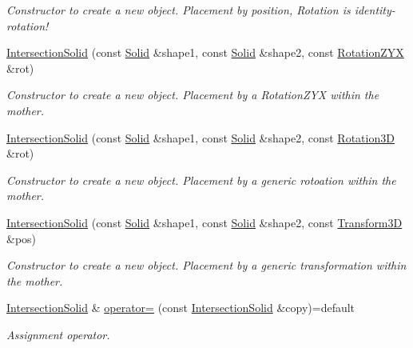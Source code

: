\begin{DoxyCompactItemize}
\begin{DoxyCompactList}\small\item\em Constructor to create a new object. Placement by position, Rotation is identity-\/rotation! \end{DoxyCompactList}\item 
\hyperlink{class_d_d4hep_1_1_geometry_1_1_intersection_solid_a350b9cf8a8d458930e25341c1be6f6af}{Intersection\+Solid} (const \hyperlink{namespace_d_d4hep_1_1_geometry_a83de90a8dcc7378ba47d54ef9a6a687b}{Solid} \&shape1, const \hyperlink{namespace_d_d4hep_1_1_geometry_a83de90a8dcc7378ba47d54ef9a6a687b}{Solid} \&shape2, const \hyperlink{namespace_d_d4hep_1_1_geometry_a24667b2b9c3cec3d5239828db4d52189}{Rotation\+Z\+YX} \&rot)
\begin{DoxyCompactList}\small\item\em Constructor to create a new object. Placement by a Rotation\+Z\+YX within the mother. \end{DoxyCompactList}\item 
\hyperlink{class_d_d4hep_1_1_geometry_1_1_intersection_solid_ae8220a5808a24ab8bacec490276ace38}{Intersection\+Solid} (const \hyperlink{namespace_d_d4hep_1_1_geometry_a83de90a8dcc7378ba47d54ef9a6a687b}{Solid} \&shape1, const \hyperlink{namespace_d_d4hep_1_1_geometry_a83de90a8dcc7378ba47d54ef9a6a687b}{Solid} \&shape2, const \hyperlink{namespace_d_d4hep_1_1_geometry_a022fecb763315fa2bf39cbb648944a0e}{Rotation3D} \&rot)
\begin{DoxyCompactList}\small\item\em Constructor to create a new object. Placement by a generic rotoation within the mother. \end{DoxyCompactList}\item 
\hyperlink{class_d_d4hep_1_1_geometry_1_1_intersection_solid_a07ed67ab3e7435dc62ecf109475a0d8d}{Intersection\+Solid} (const \hyperlink{namespace_d_d4hep_1_1_geometry_a83de90a8dcc7378ba47d54ef9a6a687b}{Solid} \&shape1, const \hyperlink{namespace_d_d4hep_1_1_geometry_a83de90a8dcc7378ba47d54ef9a6a687b}{Solid} \&shape2, const \hyperlink{namespace_d_d4hep_1_1_geometry_aeb4c0356d12fd7be49a0aae50514e64b}{Transform3D} \&pos)
\begin{DoxyCompactList}\small\item\em Constructor to create a new object. Placement by a generic transformation within the mother. \end{DoxyCompactList}\item 
\hyperlink{class_d_d4hep_1_1_geometry_1_1_intersection_solid}{Intersection\+Solid} \& \hyperlink{class_d_d4hep_1_1_geometry_1_1_intersection_solid_a4a3efd16f6626442cc69114f73ce845a}{operator=} (const \hyperlink{class_d_d4hep_1_1_geometry_1_1_intersection_solid}{Intersection\+Solid} \&copy)=default
\begin{DoxyCompactList}\small\item\em Assignment operator. \end{DoxyCompactList}\end{DoxyCompactItemize}
